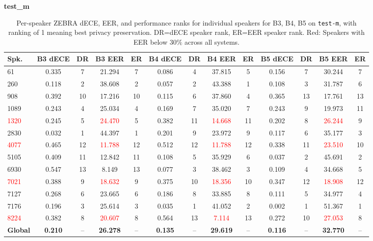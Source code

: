 \documentclass[12pt,leqno,a4paper]{article}
\begin{document}
\begin{table}[H]
\centering
\textbf{test\_m}\\[2pt]
\scriptsize
\setlength{\tabcolsep}{3pt}
\begin{tabular}{lcccccccccccc}
\toprule
\textbf{Spk.}
& \textbf{B3 dECE} & \textbf{DR} & \textbf{B3 EER} & \textbf{ER}
& \textbf{B4 dECE} & \textbf{DR} & \textbf{B4 EER} & \textbf{ER}
& \textbf{B5 dECE} & \textbf{DR} & \textbf{B5 EER} & \textbf{ER} \\
\midrule
61   & 0.335 & 7  & 21.294 & 7  & 0.086 & 4  & 37.815 & 5  
     & 0.156 & 7  & 30.244 & 7  \\
260  & 0.118 & 2  & 38.608 & 2  & 0.057 & 2  & 43.388 & 1  
     & 0.108 & 3  & 31.787 & 6  \\
908  & 0.392 & 10 & 17.216 & 10 & 0.115 & 6  & 37.860 & 4  
     & 0.365 & 13 & 17.761 & 13 \\
1089 & 0.243 & 4  & 25.034 & 4  & 0.169 & 7  & 35.020 & 7  
     & 0.243 & 9  & 19.973 & 11 \\
\textcolor{red}{1320} 
     & 0.245 & 5  & \textcolor{red}{24.470} & 5  
     & 0.382 & 11 & \textcolor{red}{14.668} & 11 
     & 0.202 & 8  & \textcolor{red}{26.244} & 9  \\
2830 & 0.032 & 1  & 44.397 & 1  & 0.201 & 9  & 23.972 & 9  
     & 0.117 & 6  & 35.177 & 3  \\
\textcolor{red}{4077} 
     & 0.465 & 12 & \textcolor{red}{11.788} & 12 
     & 0.512 & 12 & \textcolor{red}{11.788} & 12 
     & 0.338 & 11 & \textcolor{red}{23.510} & 10 \\
5105 & 0.409 & 11 & 12.842 & 11 & 0.108 & 5  & 35.929 & 6  
     & 0.037 & 2  & 45.691 & 2  \\
6930 & 0.547 & 13 & 8.149  & 13 & 0.077 & 3  & 38.462 & 3  
     & 0.109 & 4  & 34.668 & 5  \\
\textcolor{red}{7021} 
     & 0.388 & 9  & \textcolor{red}{18.632} & 9  
     & 0.375 & 10 & \textcolor{red}{18.356} & 10 
     & 0.347 & 12 & \textcolor{red}{18.908} & 12 \\
7127 & 0.268 & 6  & 23.665 & 6  & 0.186 & 8  & 33.885 & 8  
     & 0.111 & 5  & 34.977 & 4  \\
7176 & 0.196 & 3  & 25.614 & 3  & 0.035 & 1  & 41.052 & 2  
     & 0.002 & 1  & 51.367 & 1  \\
\textcolor{red}{8224} 
     & 0.382 & 8  & \textcolor{red}{20.607} & 8  
     & 0.564 & 13 & \textcolor{red}{7.114}  & 13 
     & 0.272 & 10 & \textcolor{red}{27.053} & 8  \\
\midrule
\textbf{Global}
& \textbf{0.210} & -- & \textbf{26.278} & --
& \textbf{0.135} & -- & \textbf{29.619} & --
& \textbf{0.116} & -- & \textbf{32.770} & -- \\
\bottomrule
\end{tabular}
\caption{Per-speaker ZEBRA dECE, EER, and performance ranks for individual speakers for B3, B4, B5 on \texttt{test-m}, with ranking of 1 meaning best privacy preservation. DR=dECE speaker rank, ER=EER speaker rank. Red: Speakers with EER below $30\%$ across all systems.}
\label{tab:test_m_zebra_eer_ranks}
\end{table}
\end{document}
